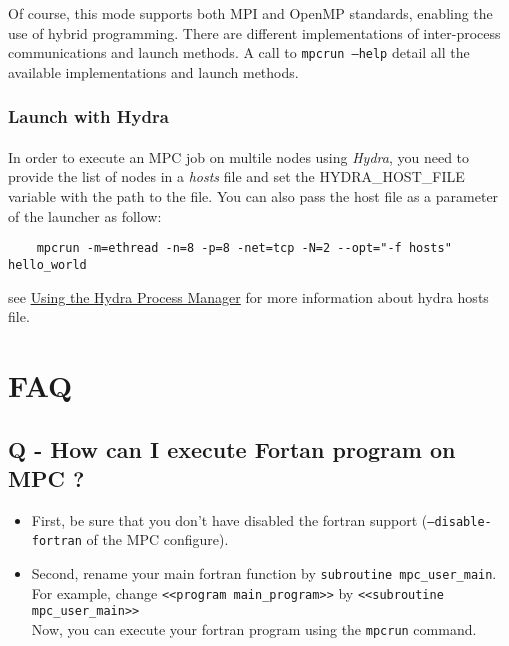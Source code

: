 \documentclass[a4paper,11pt]{article}
\begin{document}
Of course, this mode supports both MPI and OpenMP standards, enabling the use of
hybrid programming. There are different implementations of inter-process
communications and launch methods. A call to {\tt mpcrun --help} detail all the
available implementations and launch methods.

\subsubsection{Launch with Hydra}
\paragraph{}
In order to execute an MPC job on multile nodes using \emph{Hydra}, you need to provide the list of nodes in a \emph{hosts} file and set the HYDRA\_HOST\_FILE variable with the path to the file.
You can also pass the host file as a parameter of the launcher as follow:

\begin{lstlisting}
	mpcrun -m=ethread -n=8 -p=8 -net=tcp -N=2 --opt="-f hosts" hello_world
\end{lstlisting}
see \href{http://wiki.mcs.anl.gov/mpich2/index.php/Using_the_Hydra_Process_Manager}{Using the Hydra Process Manager} for more information about hydra hosts file.

\section{FAQ}
\label{sec:faq}
\subsection*{Q - How can I execute Fortan program on MPC ?}
\begin{itemize}

 \item First, be sure that you don't have disabled the fortran support
(\texttt{--disable-fortran} of the MPC configure).
 \item Second, rename your main fortran function by {\tt subroutine
mpc\_user\_main}.\\
For example, change {\tt{\textless}{\textless}program main\_program{\textgreater}{\textgreater}} by {\tt{\textless}{\textless}subroutine mpc\_user\_main{\textgreater}{\textgreater}}\\
Now, you can execute your fortran program using the \texttt{mpcrun} command.
\end{itemize}
\end{document}
